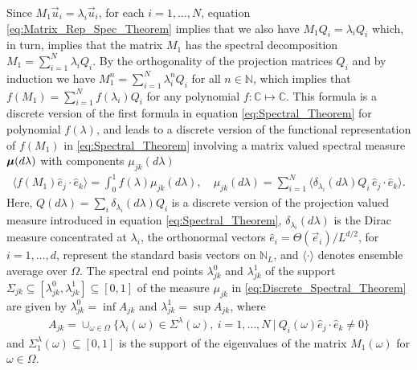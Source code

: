 \documentclass{cmslatex}
\newcommand\bmu{\mbox{\boldmath${\mu}$}}
\begin{document}
Since $M_1\vec{u}_i=\lambda_i\vec{u}_i$, for each $i=1,\ldots,N$, equation
\eqref{eq:Matrix_Rep_Spec_Theorem} implies that we also have
$M_1Q_i=\lambda_iQ_i$ which, in turn, implies that the matrix  $M_1$ has the
spectral decomposition $M_1=\sum_{i=1}^N\lambda_iQ_i$. By the orthogonality of
the projection matrices $Q_i$ and by induction we have
$M_1^n=\sum_{i=1}^N\lambda_i^nQ_i$ for all $n\in\mathbb{N}$, which implies that
$f(M_1)=\sum_{i=1}^Nf(\lambda_i)Q_i$ for any polynomial
$f:\mathbb{C}\mapsto\mathbb{C}$.  This formula is a discrete version of the
first formula in equation \eqref{eq:Spectral_Theorem} for polynomial
$f(\lambda)$, and leads to a discrete version of the functional
representation of  $f(M_1)$ in \eqref{eq:Spectral_Theorem} involving a
matrix valued spectral measure $\bmu(d\lambda)$ with components $\mu_{jk}(d\lambda)$
%
\begin{align}\label{eq:Discrete_Spectral_Theorem}
  \langle f(M_1)\hat{e}_j\cdot\hat{e}_k\rangle= \int_0^1f(\lambda)\mu_{jk}(d\lambda), \quad
  \mu_{jk}(d\lambda)=\sum_{i=1}^N\langle\delta_{\lambda_i}(d\lambda)Q_i\,\hat{e}_j\cdot\hat{e}_k\rangle.
\end{align}
%
Here, $Q(d\lambda)=\sum_i\delta_{\lambda_i}(d\lambda)Q_i$ is a discrete version of the
projection valued measure introduced in equation
\eqref{eq:Spectral_Theorem}, $\delta_{\lambda_i}(d\lambda)$ is the Dirac measure
concentrated at $\lambda_i$, the orthonormal vectors
$\hat{e}_i=\Theta(\vec{e}_i)/L^{d/2}$, for $i=1,\ldots,d$, represent the standard
basis vectors on $\mathbb{N}_L$, and $\langle\cdot\rangle$ denotes ensemble
average over $\Omega$. The spectral end points $\lambda_{jk}^0$ and $\lambda_{jk}^1$ of the
support $\Sigma_{jk}\subseteq[\lambda_{jk}^0,\lambda_{jk}^1]\subseteq[0,1]$ of the measure $\mu_{jk}$ in
\eqref{eq:Discrete_Spectral_Theorem} are given by
$\lambda_{jk}^0=\inf A_{jk}$ and $\lambda_{jk}^1=\sup A_{jk}$, where
%
\begin{align*}
  A_{jk}= \cup_{\omega\in\Omega}\{\lambda_i(\omega)\in\Sigma^\lambda(\omega), \   i=1,\ldots,N \ | \ Q_i(\omega)\hat{e}_j\cdot\hat{e}_k\neq0\}
\end{align*}
%
and $\Sigma^\lambda_1(\omega)\subseteq[0,1]$ is the support of the eigenvalues of the matrix
$M_1(\omega)$ for $\omega\in\Omega$. 
\end{document}
